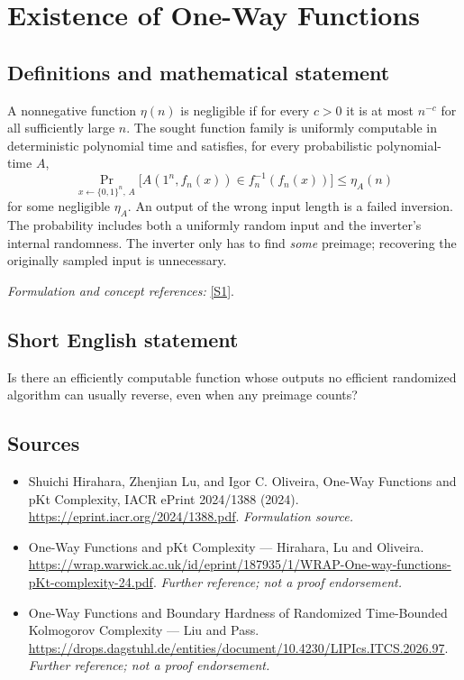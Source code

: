 \documentclass[11pt]{article}
\begin{document}
\section*{\texorpdfstring{Existence of One-Way Functions}{Existence of One-Way Functions}}\label{8}
\subsection{Definitions and mathematical statement}
A nonnegative function $\eta(n)$ is negligible if for every $c>0$ it is at most $n^{-c}$ for all sufficiently large $n$. The sought function family is uniformly computable in deterministic polynomial time and satisfies, for every probabilistic polynomial-time $A$,
\[
 \Pr_{x\leftarrow\{0,1\}^n,\,A}\!\bigl[A(1^n,f_n(x))\in f_n^{-1}(f_n(x))\bigr]
 \le \eta_A(n)
\]
for some negligible $\eta_A$. An output of the wrong input length is a failed inversion. The probability includes both a uniformly random input and the inverter's internal randomness. The inverter only has to find \emph{some} preimage; recovering the originally sampled input is unnecessary.
\par\smallskip\textit{Formulation and concept references:} \href{https://eprint.iacr.org/2024/1388.pdf}{[S1]}.

\subsection{Short English statement}
Is there an efficiently computable function whose outputs no efficient randomized algorithm can usually reverse, even when any preimage counts?
\subsection{Sources}
\begin{itemize}
\item[S1]Shuichi Hirahara, Zhenjian Lu, and Igor C. Oliveira, One-Way Functions and pKt Complexity, IACR ePrint 2024/1388 (2024).
\url{https://eprint.iacr.org/2024/1388.pdf}.
\textit{Formulation source.}
\item[S2]One-Way Functions and pKt Complexity — Hirahara, Lu and Oliveira.
\url{https://wrap.warwick.ac.uk/id/eprint/187935/1/WRAP-One-way-functions-pKt-complexity-24.pdf}.
\textit{Further reference; not a proof endorsement.}
\item[S3]One-Way Functions and Boundary Hardness of Randomized Time-Bounded Kolmogorov Complexity — Liu and Pass.
\url{https://drops.dagstuhl.de/entities/document/10.4230/LIPIcs.ITCS.2026.97}.
\textit{Further reference; not a proof endorsement.}
\end{itemize}
\end{document}
